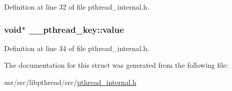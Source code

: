 Definition at line 32 of file pthread\+\_\+internal.\+h.

\hypertarget{struct____pthread__key_a35d38627e4a0de2e247671f0b5b6322a}{
\subsubsection[{value}]{\setlength{\rightskip}{0pt plus 5cm}void$\ast$ \+\_\+\+\_\+pthread\+\_\+key\+::value}}\label{struct____pthread__key_a35d38627e4a0de2e247671f0b5b6322a}


Definition at line 34 of file pthread\+\_\+internal.\+h.



The documentation for this struct was generated from the following file\+:\begin{DoxyCompactItemize}
\item 
usr/src/libpthread/src/\hyperlink{pthread__internal_8h}{pthread\+\_\+internal.\+h}\end{DoxyCompactItemize}
